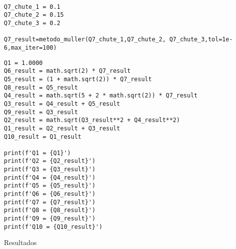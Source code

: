 \documentclass[12pt]{article}
\begin{document}
\begin{codelisting}[H]
\begin{verbatim}

Q7_chute_1 = 0.1
Q7_chute_2 = 0.15
Q7_chute_3 = 0.2

Q7_result=metodo_muller(Q7_chute_1,Q7_chute_2, Q7_chute_3,tol=1e-6,max_iter=100)
\end{verbatim}
\begin{verbatim}
Q1 = 1.0000
Q6_result = math.sqrt(2) * Q7_result
Q5_result = (1 + math.sqrt(2)) * Q7_result
Q8_result = Q5_result
Q4_result = math.sqrt(5 + 2 * math.sqrt(2)) * Q7_result
Q3_result = Q4_result + Q5_result
Q9_result = Q3_result
Q2_result = math.sqrt(Q3_result**2 + Q4_result**2)
Q1_result = Q2_result + Q3_result
Q10_result = Q1_result

print(f'Q1 = {Q1}')
print(f'Q2 = {Q2_result}')
print(f'Q3 = {Q3_result}')
print(f'Q4 = {Q4_result}')
print(f'Q5 = {Q5_result}')
print(f'Q6 = {Q6_result}')
print(f'Q7 = {Q7_result}')
print(f'Q8 = {Q8_result}')
print(f'Q9 = {Q9_result}')
print(f'Q10 = {Q10_result}')

\end{verbatim}
\caption{Resultados}
\label{code:resultados}
\end{codelisting}
\end{document}
